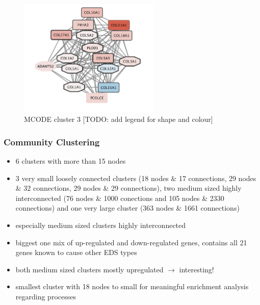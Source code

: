 \begin{figure}[htb!]
	\centering
	\includegraphics[width=0.6\textwidth]{fig/MCODE-cluster3.png}
	\caption{MCODE cluster 3 [TODO: add legend for shape and colour]}
	\label{fig:mcode3}
\end{figure}

\subsubsection{Community Clustering}

\begin{itemize}
	\item 6 clusters with more than 15 nodes
	\item 3 very small loosely connected clusters (18 nodes \& 17 connections, 29 nodes \& 32 connections, 29 nodes \& 29 connections), two medium sized highly interconnected (76 nodes \& 1000 conections and 105 nodes \& 2330 connections) and one very large cluster (363 nodes \& 1661 connections)
	\item especially medium sized clusters highly interconnected
	\item biggest one mix of up-regulated and down-regulated genes, contains all 21 genes known to cause other EDS types
	\item both medium sized clusters mostly upregulated $\rightarrow$ interesting!
	\item smallest cluster with 18 nodes to small for meaningful enrichment analysis regarding processes
\end{itemize}